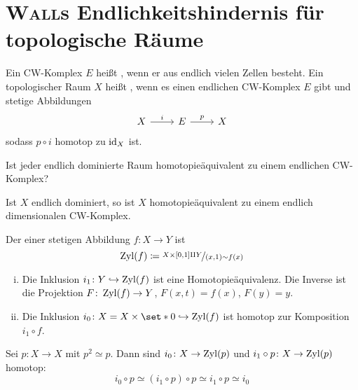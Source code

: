 \section{\textsc{Wall}s Endlichkeitshindernis für topologische Räume} %
\label{sec:4}
\begin{definition}[{name=[{endlicher CW-Komplex}]}]
	Ein CW-Komplex $E$ heißt , wenn er aus endlich vielen Zellen besteht. 
	Ein topologischer Raum $X$ heißt , wenn es einen endlichen CW-Komplex $E$ gibt und stetige Abbildungen
	\[
		\begin{tikzcd}
			X \rar["i"] & E \rar["p"] & X
		\end{tikzcd}
	\]
	sodass $p \circ i$ homotop zu $\operatorname{id}_X$ ist.
\end{definition}

\begin{frage}
	Ist jeder endlich dominierte Raum homotopieäquivalent zu einem endlichen CW-Komplex?
\end{frage}

\begin{satz}[label=satz:endl_dom_endl_cw]
	Ist $X$ endlich dominiert, so ist $X$ homotopieäquivalent zu einem endlich dimensionalen CW-Komplex.
\end{satz}

\begin{definition}[{name=[{Abbildungszylinder}]}]
	Der  einer stetigen Abbildung $f \colon X \to Y$ ist 
	\[
		\operatorname{Zyl}(f) \coloneqq \nicefrac{X \times [0,1] \amalg Y}{(x,1) \sim f(x)}
	\]
\end{definition}

\begin{bemerkung}
	\begin{enumerate}[(i)]
		\item Die Inklusion $i_1 \colon Y \hookrightarrow \operatorname{Zyl}(f)$ ist eine Homotopieäquivalenz.
		Die Inverse ist die Projektion $F \colon \operatorname{Zyl}(f) \to Y$, $F(x,t) = f(x)$, $F(y)=y$.
		\item Die Inklusion $i_0 \colon X = X \times \set*{0} \hookrightarrow \Zyl(f)$ ist homotop zur Komposition $i_1 \circ f$.
	\end{enumerate}
\end{bemerkung}

\begin{beispiel}
	Sei $p \colon X \to X$ mit $p^2 \simeq p$.
	Dann sind $i_0 \colon X \to \operatorname{Zyl}(p)$ und $i_1 \circ p \colon X \to \operatorname{Zyl}(p)$ homotop: 
	\[
		i_0 \circ p \simeq (i_1 \circ p) \circ p \simeq i_1 \circ p \simeq i_0
	\]
\end{beispiel}

